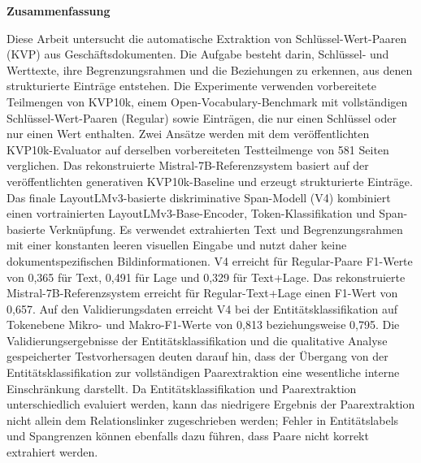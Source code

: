 \cleardoublepage
\thispagestyle{empty}

\begin{center}
  \bfseries
  {Zusammenfassung}
\end{center}
\normalfont

\vspace{0.5cm}

{

Diese Arbeit untersucht die automatische Extraktion von Schlüssel-Wert-Paaren
(KVP) aus Geschäftsdokumenten. Die Aufgabe besteht darin, Schlüssel- und
Werttexte, ihre Begrenzungsrahmen und die Beziehungen zu erkennen, aus denen
strukturierte Einträge entstehen. Die Experimente verwenden vorbereitete Teilmengen von KVP10k, einem
Open-Vocabulary-Benchmark mit vollständigen Schlüssel-Wert-Paaren (Regular)
sowie Einträgen, die nur einen Schlüssel oder nur einen Wert enthalten. Zwei
Ansätze werden mit dem veröffentlichten KVP10k-Evaluator auf derselben
vorbereiteten Testteilmenge von 581 Seiten verglichen. Das rekonstruierte
Mistral-7B-Referenzsystem basiert auf der veröffentlichten generativen
KVP10k-Baseline und erzeugt strukturierte Einträge. Das finale
LayoutLMv3-basierte diskriminative Span-Modell (V4) kombiniert einen
vortrainierten LayoutLMv3-Base-Encoder, Token-Klassifikation und Span-basierte
Verknüpfung. Es verwendet extrahierten Text und Begrenzungsrahmen mit einer
konstanten leeren visuellen Eingabe und nutzt daher keine dokumentspezifischen
Bildinformationen. V4 erreicht für Regular-Paare F1-Werte von 0,365 für Text,
0,491 für Lage und 0,329 für Text+Lage. Das rekonstruierte
Mistral-7B-Referenzsystem erreicht für Regular-Text+Lage einen F1-Wert von
0,657. Auf den Validierungsdaten erreicht V4 bei der Entitätsklassifikation auf
Tokenebene Mikro- und Makro-F1-Werte von 0,813 beziehungsweise 0,795. Die
Validierungsergebnisse der Entitätsklassifikation und die qualitative Analyse
gespeicherter Testvorhersagen deuten darauf hin, dass der Übergang von der
Entitätsklassifikation zur vollständigen Paarextraktion eine wesentliche interne
Einschränkung darstellt. Da Entitätsklassifikation und Paarextraktion
unterschiedlich evaluiert werden, kann das niedrigere Ergebnis der
Paarextraktion nicht allein dem Relationslinker zugeschrieben werden; Fehler in
Entitätslabels und Spangrenzen können ebenfalls dazu führen, dass Paare nicht
korrekt extrahiert werden.
}

\clearpage

